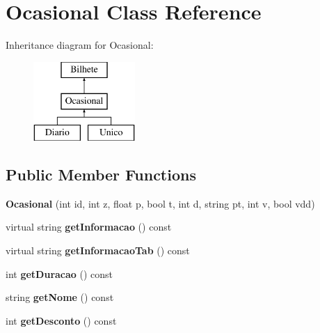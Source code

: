 \hypertarget{classOcasional}{}\section{Ocasional Class Reference}
\label{classOcasional}
Inheritance diagram for Ocasional\+:\begin{figure}[H]
\begin{center}
\leavevmode
\includegraphics[height=3.000000cm]{classOcasional}
\end{center}
\end{figure}
\subsection*{Public Member Functions}
\begin{DoxyCompactItemize}
\item 
\mbox{\label{classOcasional_a2d589082df2e44ea3fb5b309c57b4d01}} 
{\bfseries Ocasional} (int id, int z, float p, bool t, int d, string pt, int v, bool vdd)
\item 
\mbox{\label{classOcasional_a526fb43e9a9373401b25b5a82d9567af}} 
virtual string {\bfseries get\+Informacao} () const
\item 
\mbox{\label{classOcasional_ad86bcab9c7c564a303f023f47cc1e99d}} 
virtual string {\bfseries get\+Informacao\+Tab} () const
\item 
\mbox{\label{classOcasional_a62c5dfdd3fb99eeb7d508eb2dd13ba80}} 
int {\bfseries get\+Duracao} () const
\item 
\mbox{\label{classOcasional_a0be2979e7c4a9225cfe9f410c4acb4fc}} 
string {\bfseries get\+Nome} () const
\item 
\mbox{\label{classOcasional_aeac209179b1bb75f8175f3afc9524767}} 
int {\bfseries get\+Desconto} () const
\end{DoxyCompactItemize}
